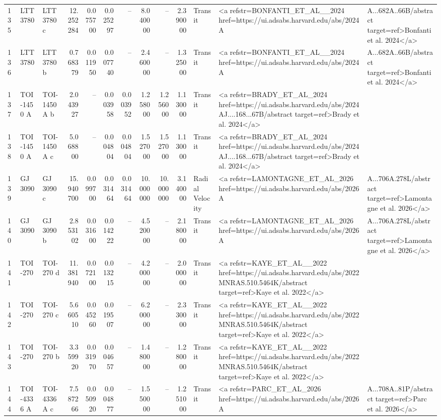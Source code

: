 \begin{tabular}{lllrrrrrrrll}
135 & LTT 3780 & LTT 3780 c & 12.252284 & 0.075700 & 0.025297 & -- & 8.040000 & -- & 2.390000 & Transit & <a refstr=BONFANTI_ET_AL__2024 href=https://ui.adsabs.harvard.edu/abs/2024A&A...682A..66B/abstract target=ref>Bonfanti et al. 2024</a> \\
136 & LTT 3780 & LTT 3780 b & 0.768379 & 0.011950 & 0.007740 & -- & 2.460000 & -- & 1.325000 & Transit & <a refstr=BONFANTI_ET_AL__2024 href=https://ui.adsabs.harvard.edu/abs/2024A&A...682A..66B/abstract target=ref>Bonfanti et al. 2024</a> \\
137 & TOI-1450 A & TOI-1450 A b & 2.043927 & -- & 0.003958 & 0.003952 & 1.258000 & 1.256000 & 1.130000 & Transit & <a refstr=BRADY_ET_AL_2024 href=https://ui.adsabs.harvard.edu/abs/2024AJ....168...67B/abstract target=ref>Brady et al. 2024</a> \\
138 & TOI-1450 A & TOI-1450 A c & 5.068800 & -- & 0.004804 & 0.004804 & 1.527000 & 1.527000 & 1.130000 & Transit & <a refstr=BRADY_ET_AL_2024 href=https://ui.adsabs.harvard.edu/abs/2024AJ....168...67B/abstract target=ref>Brady et al. 2024</a> \\
139 & GJ 3090 & GJ 3090 c & 15.940700 & 0.099700 & 0.031464 & 0.031464 & 10.000000 & 10.000000 & 3.140000 & Radial Velocity & <a refstr=LAMONTAGNE_ET_AL_2026 href=https://ui.adsabs.harvard.edu/abs/2026A&A...706A.278L/abstract target=ref>Lamontagne et al. 2026</a> \\
140 & GJ 3090 & GJ 3090 b & 2.853102 & 0.031600 & 0.014222 & -- & 4.520000 & -- & 2.180000 & Transit & <a refstr=LAMONTAGNE_ET_AL_2026 href=https://ui.adsabs.harvard.edu/abs/2026A&A...706A.278L/abstract target=ref>Lamontagne et al. 2026</a> \\
141 & TOI-270 & TOI-270 d & 11.381940 & 0.072100 & 0.013215 & -- & 4.200000 & -- & 2.000000 & Transit & <a refstr=KAYE_ET_AL__2022 href=https://ui.adsabs.harvard.edu/abs/2022MNRAS.510.5464K/abstract target=ref>Kaye et al. 2022</a> \\
142 & TOI-270 & TOI-270 c & 5.660510 & 0.045260 & 0.019507 & -- & 6.200000 & -- & 2.330000 & Transit & <a refstr=KAYE_ET_AL__2022 href=https://ui.adsabs.harvard.edu/abs/2022MNRAS.510.5464K/abstract target=ref>Kaye et al. 2022</a> \\
143 & TOI-270 & TOI-270 b & 3.359920 & 0.031970 & 0.004657 & -- & 1.480000 & -- & 1.280000 & Transit & <a refstr=KAYE_ET_AL__2022 href=https://ui.adsabs.harvard.edu/abs/2022MNRAS.510.5464K/abstract target=ref>Kaye et al. 2022</a> \\
144 & TOI-4336 A & TOI-4336 A c & 7.587266 & 0.050920 & 0.004877 & -- & 1.550000 & -- & 1.251000 & Transit & <a refstr=PARC_ET_AL_2026 href=https://ui.adsabs.harvard.edu/abs/2026A&A...708A..81P/abstract target=ref>Parc et al. 2026</a> \\

\end{tabular}

